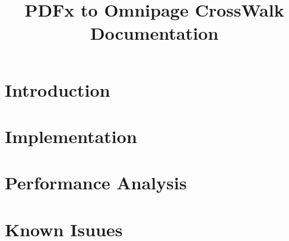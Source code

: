 \documentclass[12pt]{scrreprt}
\title{PDFx to Omnipage CrossWalk Documentation}
\date{}
\begin{document}
\maketitle

\tableofcontents

\chapter{Introduction}
\label{section:introduction}


\chapter{Implementation}
\label{section: method}


\chapter{Performance Analysis}
\label{section:discussion}
%

\chapter{Known Isuues}
\label{section:conclusion}
%
\end{document}

